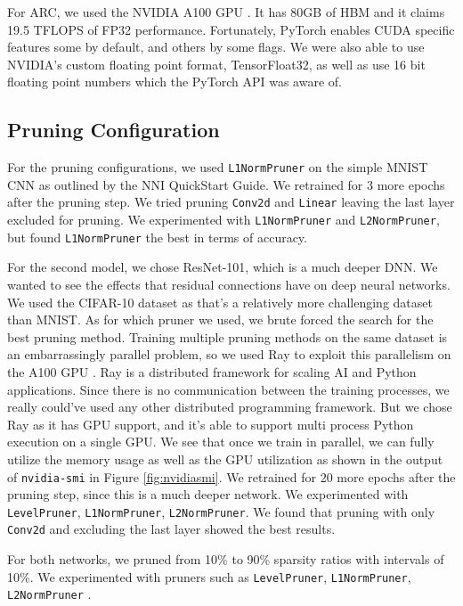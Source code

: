 \documentclass{article}
\begin{document}
For ARC, we used the NVIDIA A100 GPU \cite{a100}. It has 80GB of HBM and it claims 19.5 TFLOPS of FP32 performance. Fortunately, PyTorch enables CUDA specific features some by default, and others by some flags. We were also able to use NVIDIA's custom floating point format, TensorFloat32, as well as use 16 bit floating point numbers which the PyTorch API was aware of.


\subsection{Pruning Configuration}
For the pruning configurations, we used \verb|L1NormPruner| on the simple MNIST CNN as outlined by the NNI QuickStart Guide. We retrained for 3 more epochs after the pruning step. We tried pruning \verb|Conv2d| and \verb|Linear| leaving the last layer excluded for pruning. We experimented with \verb|L1NormPruner| and \verb|L2NormPruner|, but found \verb|L1NormPruner| the best in terms of accuracy.

For the second model, we chose ResNet-101, which is a much deeper DNN. We wanted to see the effects that residual connections have on deep neural networks. We used the CIFAR-10 dataset as that's a relatively more challenging dataset than MNIST. As for which pruner we used, we brute forced the search for the best pruning method. Training multiple pruning methods on the same dataset is an embarrassingly parallel problem, so we used Ray to exploit this parallelism on the A100 GPU \cite{ray}. Ray is a distributed framework for scaling AI and Python applications. Since there is no communication between the training processes, we really could've used any other distributed programming framework. But we chose Ray as it has GPU support, and it's able to support multi process Python execution on a single GPU. We see that once we train in parallel, we can fully utilize the memory usage as well as the GPU utilization as shown in the output of \verb|nvidia-smi| in Figure \ref{fig:nvidiasmi}. We retrained for 20 more epochs after the pruning step, since this is a much deeper network. We experimented with \verb|LevelPruner|, \verb|L1NormPruner|, \verb|L2NormPruner|. We found that pruning with only \verb|Conv2d| and excluding the last layer showed the best results.

For both networks, we pruned from 10\% to 90\% sparsity ratios with intervals of 10\%. We experimented with pruners such as \verb|LevelPruner|, \verb|L1NormPruner|, \verb|L2NormPruner| \cite{levelpruner, l1prune}. 
\end{document}
